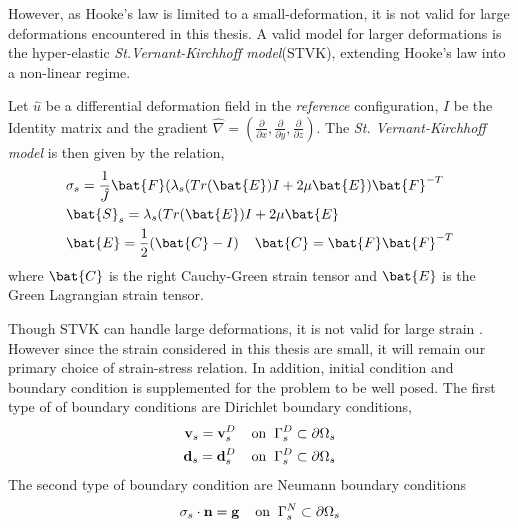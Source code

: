However, as Hooke's law is limited to a small-deformation, it is not valid for large deformations encountered in this thesis. A valid model for larger deformations is the  hyper-elastic \textit{St.\@ Vernant-Kirchhoff model}(STVK), 
extending Hooke's law into a non-linear regime.
 \begin{defn}
Let $\hat{u}$ be a differential deformation field in the \textit{reference} configuration, $I$ be the Identity matrix and the gradient $\hat{\nabla} = (\frac{\partial}{\partial x}, \frac{\partial}{\partial y}, \frac{\partial}{\partial z}) $. The \textit{St. Vernant-Kirchhoff model} is then given by the relation,
\begin{align*}
&\sigma_s = \frac{1}{\hat{J}} \bat{F}(\lambda_s(Tr(\bat{E}) I + 2 \mu \bat{E})\bat{F}^{-T} \\
&\bat{S}_s = \lambda_s(Tr(\bat{E}) I + 2 \mu \bat{E} \\
&\bat{E} = \frac{1}{2}(\bat{C} - I ) \hspace{4mm} \bat{C} = \bat{F}\bat{F}^{-T}
\end{align*} 
where $\bat{C}$ is the right Cauchy-Green strain tensor and $\bat{E}$ is the Green Lagrangian strain tensor.
\end{defn}
  
Though STVK can handle large deformations, it is not valid for large strain \cite{Razzaq2010}. However since the strain considered in this thesis are small, it will remain our primary choice of strain-stress relation. In addition, initial condition and boundary condition is supplemented for the problem to be well posed. The first type of of boundary conditions are Dirichlet boundary conditions, 
\begin{align}
\mathbf{v}_s = \mathbf{v}_s^D 
\hspace{4mm} \text{on} \hspace{2mm} \Gamma_s^D \subset \partial \Omega_s  \\
\mathbf{d}_s = \mathbf{d}_s^D 
\hspace{4mm} \text{on} \hspace{2mm} \Gamma_s^D \subset \partial \Omega_s  \\
\end{align}
The second type of boundary condition are Neumann boundary conditions
\begin{align}
\sigma_s \cdot \mathbf{n} = \mathbf{g}  
\hspace{4mm} \text{on} \hspace{2mm} \Gamma_s^N \subset \partial \Omega_s 
\end{align}
 \newpage
